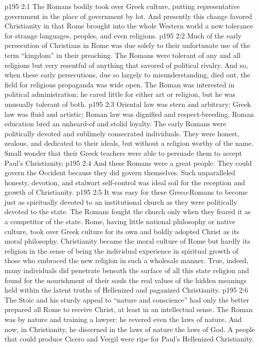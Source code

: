 \vs p195 2:1 The Romans bodily took over Greek culture, putting representative government in the place of government by lot. And presently this change favored Christianity in that Rome brought into the whole Western world a new tolerance for strange languages, peoples, and even religions.
\vs p195 2:2 Much of the early persecution of Christians in Rome was due solely to their unfortunate use of the term “kingdom” in their preaching. The Romans were tolerant of any and all religions but very resentful of anything that savored of political rivalry. And so, when these early persecutions, due so largely to misunderstanding, died out, the field for religious propaganda was wide open. The Roman was interested in political administration; he cared little for either art or religion, but he was unusually tolerant of both.
\vs p195 2:3 Oriental law was stern and arbitrary; Greek law was fluid and artistic; Roman law was dignified and respect\hyp{}breeding. Roman education bred an unheard\hyp{}of and stolid loyalty. The early Romans were politically devoted and sublimely consecrated individuals. They were honest, zealous, and dedicated to their ideals, but without a religion worthy of the name. Small wonder that their Greek teachers were able to persuade them to accept Paul’s Christianity.
\vs p195 2:4 And these Romans were a great people. They could govern the Occident because they did govern themselves. Such unparalleled honesty, devotion, and stalwart self\hyp{}control was ideal soil for the reception and growth of Christianity.
\vs p195 2:5 It was easy for these Greco\hyp{}Romans to become just as spiritually devoted to an institutional church as they were politically devoted to the state. The Romans fought the church only when they feared it as a competitor of the state. Rome, having little national philosophy or native culture, took over Greek culture for its own and boldly adopted Christ as its moral philosophy. Christianity became the moral culture of Rome but hardly its religion in the sense of being the individual experience in spiritual growth of those who embraced the new religion in such a wholesale manner. True, indeed, many individuals did penetrate beneath the surface of all this state religion and found for the nourishment of their souls the real values of the hidden meanings held within the latent truths of Hellenized and paganized Christianity.
\pc \vs p195 2:6 The Stoic and his sturdy appeal to “nature and conscience” had only the better prepared all Rome to receive Christ, at least in an intellectual sense. The Roman was by nature and training a lawyer; he revered even the laws of nature. And now, in Christianity, he discerned in the laws of nature the laws of God. A people that could produce Cicero and Vergil were ripe for Paul’s Hellenized Christianity.
